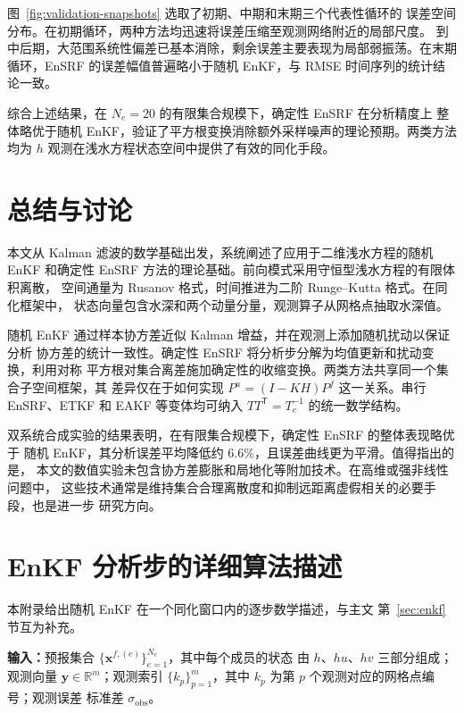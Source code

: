 \documentclass[12pt,a4paper]{article}
\newcommand{\x}{\bm{x}}
\newcommand{\y}{\bm{y}}
\newcommand{\T}{^{\mathsf T}}
\newcommand{\R}{\mathbb{R}}
\begin{document}
图~\ref{fig:validation-snapshots} 选取了初期、中期和末期三个代表性循环的
误差空间分布。在初期循环，两种方法均迅速将误差压缩至观测网络附近的局部尺度。
到中后期，大范围系统性偏差已基本消除，剩余误差主要表现为局部弱振荡。在末期
循环，EnSRF 的误差幅值普遍略小于随机 EnKF，与 RMSE 时间序列的统计结论一致。

综合上述结果，在 $N_e = 20$ 的有限集合规模下，确定性 EnSRF 在分析精度上
整体略优于随机 EnKF，验证了平方根变换消除额外采样噪声的理论预期。两类方法
均为 $h$ 观测在浅水方程状态空间中提供了有效的同化手段。

\section{总结与讨论}
\label{sec:conclusion}

本文从 Kalman 滤波的数学基础出发，系统阐述了应用于二维浅水方程的随机 EnKF
和确定性 EnSRF 方法的理论基础。前向模式采用守恒型浅水方程的有限体积离散，
空间通量为 Rusanov 格式，时间推进为二阶 Runge--Kutta 格式。在同化框架中，
状态向量包含水深和两个动量分量，观测算子从网格点抽取水深值。

随机 EnKF 通过样本协方差近似 Kalman 增益，并在观测上添加随机扰动以保证分析
协方差的统计一致性。确定性 EnSRF 将分析步分解为均值更新和扰动变换，利用对称
平方根对集合离差施加确定性的收缩变换。两类方法共享同一个集合子空间框架，其
差异仅在于如何实现 $P^a = (I - KH)P^f$ 这一关系。串行 EnSRF、ETKF 和 EAKF
等变体均可纳入 $T T\T = T_e^{-1}$ 的统一数学结构。

双系统合成实验的结果表明，在有限集合规模下，确定性 EnSRF 的整体表现略优于
随机 EnKF，其分析误差平均降低约 6.6\%，且误差曲线更为平滑。值得指出的是，
本文的数值实验未包含协方差膨胀和局地化等附加技术。在高维或强非线性问题中，
这些技术通常是维持集合合理离散度和抑制远距离虚假相关的必要手段，也是进一步
研究方向。

\appendix
\section{EnKF 分析步的详细算法描述}
\label{app:enkf}

本附录给出随机 EnKF 在一个同化窗口内的逐步数学描述，与主文
第~\ref{sec:enkf} 节互为补充。

\medskip\noindent
\textbf{输入：}预报集合 $\{\x^{f,(e)}\}_{e=1}^{N_e}$，其中每个成员的状态
由 $h$、$hu$、$hv$ 三部分组成；观测向量 $\y \in \R^m$；观测索引
$\{k_p\}_{p=1}^{m}$，其中 $k_p$ 为第 $p$ 个观测对应的网格点编号；观测误差
标准差 $\sigma_{\mathrm{obs}}$。
\end{document}
